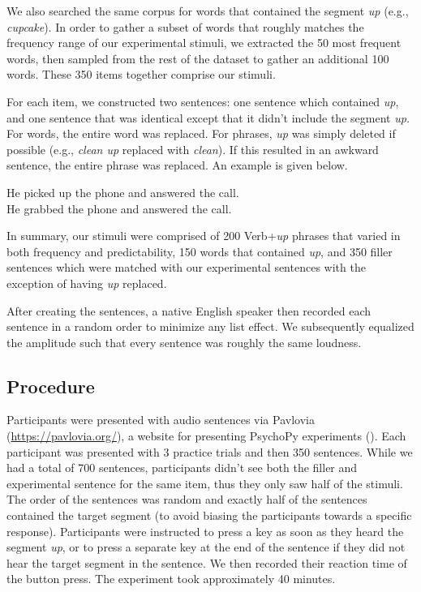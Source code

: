 \documentclass[
  12pt,
  letterpaper,
]{scrreprt}
\begin{document}
We also searched the same corpus for words that contained the segment
\emph{up} (e.g., \emph{cupcake}). In order to gather a subset of words
that roughly matches the frequency range of our experimental stimuli, we
extracted the 50 most frequent words, then sampled from the rest of the
dataset to gather an additional 100 words. These 350 items together
comprise our stimuli.

For each item, we constructed two sentences: one sentence which
contained \emph{up}, and one sentence that was identical except that it
didn't include the segment \emph{up.} For words, the entire word was
replaced. For phrases, \emph{up} was simply deleted if possible (e.g.,
\emph{clean up} replaced with \emph{clean}). If this resulted in an
awkward sentence, the entire phrase was replaced. An example is given
below.

\begin{exe} 
\ex
  \begin{xlist}
  \begin{singlespace}
    \ex He picked up the phone and answered the call. \\
    \ex He grabbed the phone and answered the call. \\
  \end{singlespace}
  \end{xlist}
\end{exe}

In summary, our stimuli were comprised of 200 Verb+\emph{up} phrases
that varied in both frequency and predictability, 150 words that
contained \emph{up}, and 350 filler sentences which were matched with
our experimental sentences with the exception of having \emph{up}
replaced.

After creating the sentences, a native English speaker then recorded
each sentence in a random order to minimize any list effect. We
subsequently equalized the amplitude such that every sentence was
roughly the same loudness.

\subsection{Procedure}\label{procedure-3}

Participants were presented with audio sentences via Pavlovia
(\url{https://pavlovia.org/}), a website for presenting PsychoPy
experiments ().
Each participant was presented with 3 practice trials and then 350
sentences. While we had a total of 700 sentences, participants didn't
see both the filler and experimental sentence for the same item, thus
they only saw half of the stimuli. The order of the sentences was random
and exactly half of the sentences contained the target segment (to avoid
biasing the participants towards a specific response). Participants were
instructed to press a key as soon as they heard the segment \emph{up},
or to press a separate key at the end of the sentence if they did not
hear the target segment in the sentence. We then recorded their reaction
time of the button press. The experiment took approximately 40 minutes.
\end{document}
